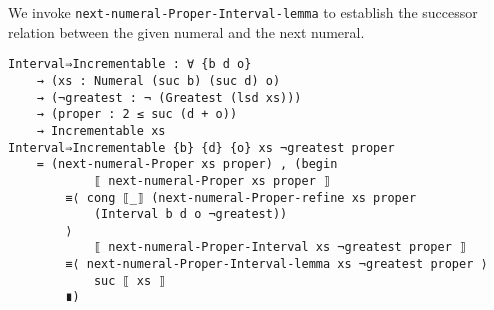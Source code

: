 \documentclass[\main/thesis.tex]{subfiles}
\begin{document}
\begin{center}
    \begin{adjustbox}{max width=\textwidth}
    \end{adjustbox}
\end{center}

We invoke \lstinline|next-numeral-Proper-Interval-lemma| to establish the
successor relation between the given numeral and the next numeral.


\begin{lstlisting}[basicstyle=\ttfamily\scriptsize]
Interval⇒Incrementable : ∀ {b d o}
    → (xs : Numeral (suc b) (suc d) o)
    → (¬greatest : ¬ (Greatest (lsd xs)))
    → (proper : 2 ≤ suc (d + o))
    → Incrementable xs
Interval⇒Incrementable {b} {d} {o} xs ¬greatest proper
    = (next-numeral-Proper xs proper) , (begin
            ⟦ next-numeral-Proper xs proper ⟧
        ≡⟨ cong ⟦_⟧ (next-numeral-Proper-refine xs proper
            (Interval b d o ¬greatest))
        ⟩
            ⟦ next-numeral-Proper-Interval xs ¬greatest proper ⟧
        ≡⟨ next-numeral-Proper-Interval-lemma xs ¬greatest proper ⟩
            suc ⟦ xs ⟧
        ∎)
\end{lstlisting}
\end{document}
